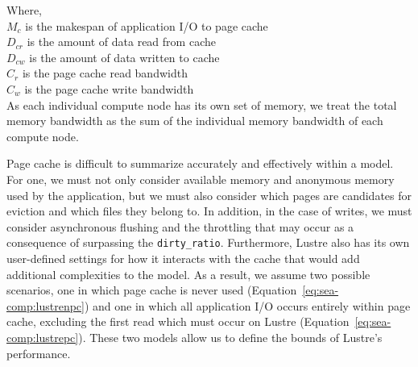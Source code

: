       Where, \\
      $M_{c}$ is the makespan of application I/O to page cache \\
      $D_{cr}$ is the amount of data read from cache \\
      $D_{cw}$ is the amount of data written to cache \\
      $C_{r}$ is the page cache read bandwidth \\
      $C_{w}$ is the page cache write bandwidth \\ 


    


       As each individual compute node has its own set of memory, we treat the
      total memory bandwidth as the sum of the individual memory bandwidth of
      each compute node.


      Page cache is difficult to summarize accurately and effectively within a
      model. For one, we must not only consider available memory and anonymous
      memory used by the application, but we must also consider which pages are
      candidates for eviction and which files they belong to. In addition, in
      the case of writes, we must consider asynchronous flushing and the
      throttling that may occur as a consequence of surpassing the
      \texttt{dirty\_ratio}. Furthermore, Lustre also has its own user-defined
      settings for how it interacts with the cache that would add additional
      complexities to the model. As a result, we assume two possible scenarios,
      one in which page cache is never used
      (Equation~\ref{eq:sea-comp:lustrenpc}) and one in which all application
      I/O occurs entirely within page cache, excluding the first read which must
      occur on Lustre (Equation~\ref{eq:sea-comp:lustrepc}). These two models
      allow us to define the bounds of Lustre's performance.

